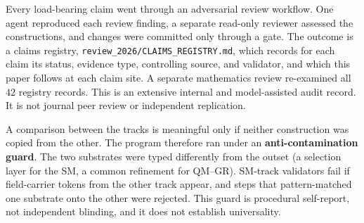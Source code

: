 Every load-bearing claim went through an adversarial review workflow. One agent reproduced each review finding,
a separate read-only reviewer assessed the constructions, and changes were committed only through a gate. The outcome
is a claims registry, \nolinkurl{review_2026/CLAIMS_REGISTRY.md}, which records for each claim its status, evidence
type, controlling source, and validator, and which this paper follows at each claim site. A separate mathematics review
re-examined all \(42\) registry records. This is an extensive internal and model-assisted audit record. It is not
journal peer review or independent replication.

A comparison between the tracks is meaningful only if neither construction was copied from the other. The program
therefore ran under an \textbf{anti-contamination guard}. The two substrates were typed differently from the outset
(a selection layer for the SM, a common refinement for QM--GR). SM-track validators fail if field-carrier tokens from the
other track appear, and steps that pattern-matched one substrate onto the other were rejected. This guard is
procedural self-report, not independent blinding, and it does not establish universality.
